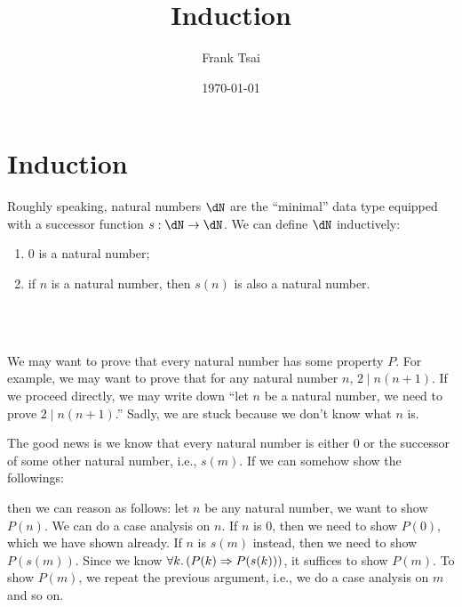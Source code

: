 \documentclass{amsart}
\title{Induction}
\author{Frank Tsai}
\date{\today}
\begin{document}
\maketitle
\tableofcontents

\section{Induction}
\label{sec:induction}

Roughly speaking, natural numbers $\dN$ are the ``minimal'' data type equipped with a successor function $s : \dN \to \dN$.
We can define $\dN$ inductively:
\begin{enumerate}
\item $0$ is a natural number;
\item if $n$ is a natural number, then $s(n)$ is also a natural number.
\end{enumerate}

\begin{code}%
\>[0]\AgdaSpace{}%
\AgdaSpace{}%
\AgdaSymbol{:}\AgdaSpace{}%
\AgdaSpace{}%
\<%
\\
\>[0][@{}l@{\AgdaIndent{0}}]%
\>[2]\AgdaSpace{}%
\AgdaSymbol{:}\AgdaSpace{}%
\<%
\\
%
\>[2]\AgdaSpace{}%
\AgdaSymbol{:}\AgdaSpace{}%
\AgdaSpace{}%
\AgdaSpace{}%
\<%
\end{code}

We may want to prove that every natural number has some property $P$.
For example, we may want to prove that for any natural number $n$, $2 \mid n(n+1)$.
If we proceed directly, we may write down ``let $n$ be a natural number, we need to prove $2 \mid n(n+1)$.''
Sadly, we are stuck because we don't know what $n$ is.

The good news is we know that every natural number is either $0$ or the successor of some other natural number, i.e., $s(m)$.
If we can somehow show the followings:
then we can reason as follows: let $n$ be any natural number, we want to show $P(n)$.
We can do a case analysis on $n$.
If $n$ is $0$, then we need to show $P(0)$, which we have shown already.
If $n$ is $s(m)$ instead, then we need to show $P(s(m))$.
Since we know $\forall k.\,(P(k) \Rightarrow P(s(k)))$, it suffices to show $P(m)$.
To show $P(m)$, we repeat the previous argument, i.e., we do a case analysis on $m$ and so on.
\end{document}
